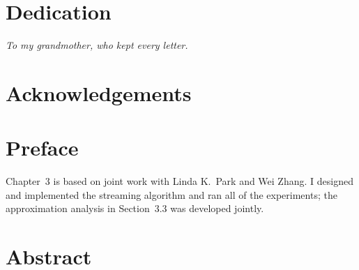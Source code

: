 \documentclass[12pt,oneside]{report}
\begin{document}


\setcounter{page}{2}%

\chapter*{Dedication}
\begin{center}\itshape To my grandmother, who kept every letter.\end{center}
\clearpage
\chapter*{Acknowledgements}

\clearpage
\chapter*{Preface}
Chapter~3 is based on joint work with Linda K.\ Park and Wei Zhang. I designed and implemented
the streaming algorithm and ran all of the experiments; the approximation analysis in
Section~3.3 was developed jointly.
\clearpage
\tableofcontents
\listoftables
\listoffigures
\clearpage
\chapter*{Abstract}

\clearpage







\appendix




\end{document}
